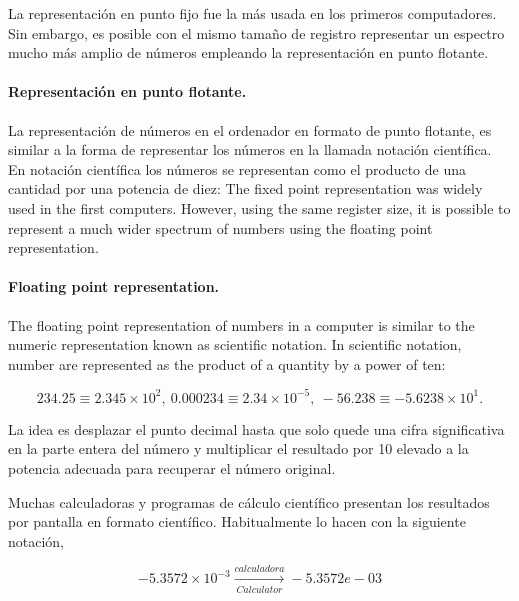 \begin{paracol}{2}
La representación en punto fijo fue la más usada en los primeros computadores. Sin embargo, es posible con el mismo tamaño de registro representar un espectro mucho más amplio de números empleando la representación en punto flotante.

\paragraph*{Representación en punto flotante.} 
La representación de números en el ordenador en formato de punto flotante, es similar a la forma de representar los números en la llamada notación científica.  En notación científica los números se representan como el producto de una cantidad por una potencia de diez:
\switchcolumn
The fixed point representation was widely used in the first computers. However, using the same register size, it is possible to represent a much wider spectrum of numbers using the floating point representation.

\paragraph{Floating point representation.} 
The floating point representation of numbers in a computer is similar to the numeric representation known as scientific notation. In scientific notation, number are represented as the product of a quantity by a power of ten:
\end{paracol}
\begin{equation*}
234.25\equiv 2.345\times 10^2,\ 0.000234\equiv 2.34\times 10^{-5},\ -56.238 \equiv -5.6238\times 10^1.    
\end{equation*}

\begin{paracol}{2}
La idea es desplazar el punto decimal hasta que solo quede una cifra significativa en la parte entera del número y multiplicar el resultado por 10 elevado a la potencia adecuada para recuperar el número original.

Muchas calculadoras y programas de cálculo científico presentan los resultados por pantalla en formato científico. Habitualmente lo hacen con la siguiente notación,
\end{paracol}

\begin{equation*}
-5.3572\times 10^{-3}  \xrightarrow[Calculator]{calculadora}  -5.3572e-03
\end{equation*}

